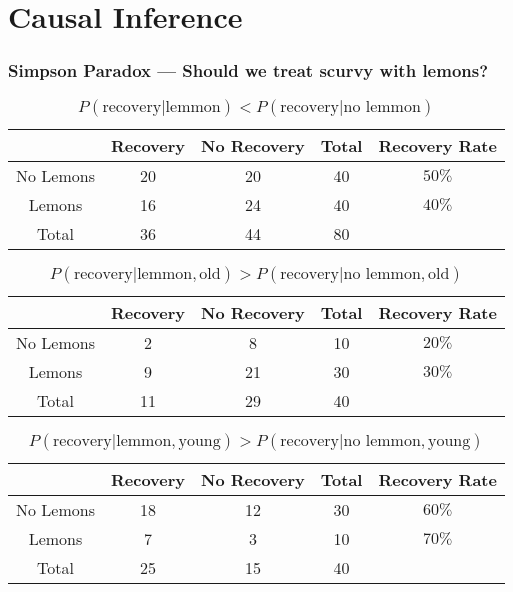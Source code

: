 \documentclass[UTF8,11pt,colorlinks,compress,openany]{beamer}%
\begin{document}
\section{Causal Inference}


\begin{frame}\frametitle{Simpson Paradox --- Should we treat scurvy with lemons?}
\vspace*{-1ex}
\begin{table}
\begin{tabu}{c|cccc}
\hline
 & Recovery & No Recovery & Total & Recovery Rate\\
\hline
No Lemons & 20 & 20 & 40 & $50\%$ \\
Lemons & 16 & 24 & 40 & $40\%$ \\
Total & 36 & 44 & 80 &\\
\hline
\end{tabu}\caption{$P(\text{recovery}|\text{lemmon})<P(\text{recovery}|\text{no lemmon})$}
\end{table}
\begin{table}
\vspace*{-1ex}
\begin{tabu}{c|cccc}
\hline
 & Recovery & No Recovery & Total & Recovery Rate\\
\hline
No Lemons & 2 & 8 & 10 & $20\%$ \\
Lemons & 9 & 21 & 30 & $30\%$ \\
Total & 11 & 29 & 40 &\\
\hline
\end{tabu}\caption{$P(\text{recovery}|\text{lemmon},\text{old})>P(\text{recovery}|\text{no lemmon},\text{old})$}
\end{table}
\vspace*{-1ex}
\begin{table}
\begin{tabu}{c|cccc}
\hline
 & Recovery & No Recovery & Total & Recovery Rate\\
\hline
No Lemons & 18 & 12 & 30 & $60\%$ \\
Lemons & 7 & 3 & 10 & $70\%$ \\
Total & 25 & 15 & 40 &\\
\hline
\end{tabu}\caption{$P(\text{recovery}|\text{lemmon},\text{young})>P(\text{recovery}|\text{no lemmon},\text{young})$}
\end{table}
\end{frame}
\end{document}
